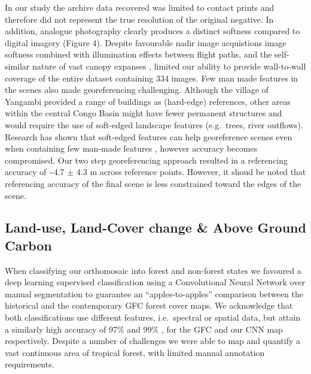 \documentclass[remote sensing,article,submit,moreauthors,pdftex,10pt,a4paper]{mdpi}
\begin{document}
In our study the archive data recovered was limited to contact prints
and therefore did not represent the true resolution of the original
negative. In addition, analogue photography clearly produces a distinct
softness compared to digital imagery (Figure 4). Despite favourable
nadir image acquistions \citep{verhoeven2017} image softness combined
with illumination effects between flight paths, and the self-similar
nature of vast canopy expanses \citep{park2019, simini2010, sole1995},
limited our ability to provide wall-to-wall coverage of the entire
dataset containing 334 images. Few man made features in the scenes also
made georeferencing challenging. Although the village of Yangambi
provided a range of buildings as (hard-edge) references, other areas
within the central Congo Basin might have fewer permanent structures and
would require the use of soft-edged landscape features (e.g.~trees,
river outflows). Research has shown that soft-edged features can help
georeference scenes even when containing few man-made features
\citep{hughes2006}, however accuracy becomes compromised. Our two step
georeferencing approach resulted in a referencing accuracy of
\textasciitilde{}4.7 \(\pm\) 4.3 m across reference points. However, it
shoud be noted that referencing accuracy of the final scene is less
constrained toward the edges of the scene.

\hypertarget{land-use-land-cover-change-above-ground-carbon}{%
\subsection{Land-use, Land-Cover change \& Above Ground
Carbon}\label{land-use-land-cover-change-above-ground-carbon}}

When classifying our orthomosaic into forest and non-forest states we
favoured a deep learning supervised classification using a Convolutional
Neural Network over manual segmentation to guarantee an
``apples-to-apples'' comparison between the historical and the
contemporary GFC forest cover maps. We acknowledge that both
classifications use different features, i.e.~spectral or spatial data,
but attain a similarly high accuracy of 97\% and 99\%
\citep{hansen2013}, for the GFC and our CNN map respectively. Despite a
number of challenges we were able to map and quantify a vast continuous
area of tropical forest, with limited manual annotation requirements.
\end{document}
